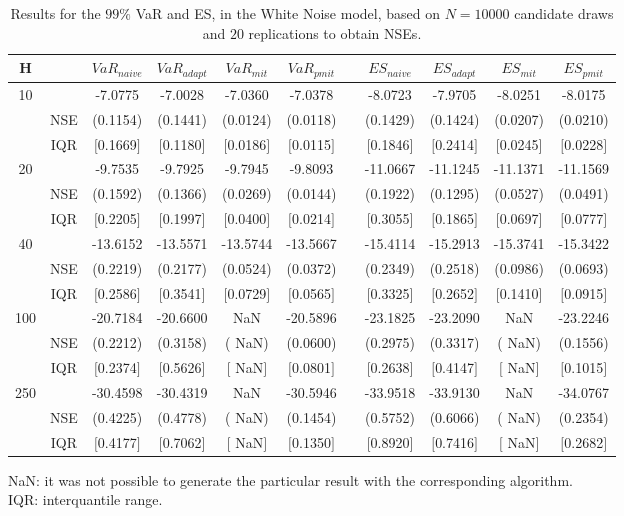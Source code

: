\begin{table}[h] 
\centering 
\caption{Results for the $99\%$ VaR and ES, in the White Noise model, based on $N=10000$ candidate draws and $20$ replications to obtain NSEs.} 
\label{tab:res_algos_WN} 
\begin{tabular}{ccccccccccc}  
 H & & $VaR_{naive}$ & $VaR_{adapt}$ & $VaR_{mit}$  & $VaR_{pmit}$ &  & $ES_{naive}$ & $ES_{adapt}$ & $ES_{mit}$ & $ES_{pmit}$ \\ \hline 
10 & & -7.0775 & -7.0028 & -7.0360 & -7.0378 & & -8.0723 & -7.9705 & -8.0251 & -8.0175  \\ 
  & NSE & (0.1154) & (0.1441) & (0.0124) & (0.0118) & & (0.1429) & (0.1424) & (0.0207) & (0.0210)   \\ 
 & IQR & $[$0.1669$]$ & $[$0.1180$]$ & $[$0.0186$]$ & $[$0.0115$]$ & & $[$0.1846$]$ & $[$0.2414$]$ & $[$0.0245$]$ & $[$0.0228$]$  \\ [1ex] 
20 & & -9.7535 & -9.7925 & -9.7945 & -9.8093 & & -11.0667 & -11.1245 & -11.1371 & -11.1569  \\ 
  & NSE & (0.1592) & (0.1366) & (0.0269) & (0.0144) & & (0.1922) & (0.1295) & (0.0527) & (0.0491)   \\ 
 & IQR & $[$0.2205$]$ & $[$0.1997$]$ & $[$0.0400$]$ & $[$0.0214$]$ & & $[$0.3055$]$ & $[$0.1865$]$ & $[$0.0697$]$ & $[$0.0777$]$  \\ [1ex] 
40 & & -13.6152 & -13.5571 & -13.5744 & -13.5667 & & -15.4114 & -15.2913 & -15.3741 & -15.3422  \\ 
  & NSE & (0.2219) & (0.2177) & (0.0524) & (0.0372) & & (0.2349) & (0.2518) & (0.0986) & (0.0693)   \\ 
 & IQR & $[$0.2586$]$ & $[$0.3541$]$ & $[$0.0729$]$ & $[$0.0565$]$ & & $[$0.3325$]$ & $[$0.2652$]$ & $[$0.1410$]$ & $[$0.0915$]$  \\ [1ex] 
100 & & -20.7184 & -20.6600 &    NaN & -20.5896 & & -23.1825 & -23.2090 &    NaN & -23.2246  \\ 
  & NSE & (0.2212) & (0.3158) & (   NaN) & (0.0600) & & (0.2975) & (0.3317) & (   NaN) & (0.1556)   \\ 
 & IQR & $[$0.2374$]$ & $[$0.5626$]$ & $[$   NaN$]$ & $[$0.0801$]$ & & $[$0.2638$]$ & $[$0.4147$]$ & $[$   NaN$]$ & $[$0.1015$]$  \\ [1ex] 
250 & & -30.4598 & -30.4319 &    NaN & -30.5946 & & -33.9518 & -33.9130 &    NaN & -34.0767  \\ 
  & NSE & (0.4225) & (0.4778) & (   NaN) & (0.1454) & & (0.5752) & (0.6066) & (   NaN) & (0.2354)   \\ 
 & IQR & $[$0.4177$]$ & $[$0.7062$]$ & $[$   NaN$]$ & $[$0.1350$]$ & & $[$0.8920$]$ & $[$0.7416$]$ & $[$   NaN$]$ & $[$0.2682$]$  \\ [1ex] 
\hline 
\end{tabular} 
\raggedright 

\vspace{5pt}\footnotesize{NaN: it was not possible to generate the particular result with the corresponding algorithm.} \\ 
\vspace{5pt}\footnotesize{IQR: interquantile range.} 
\end{table} 
